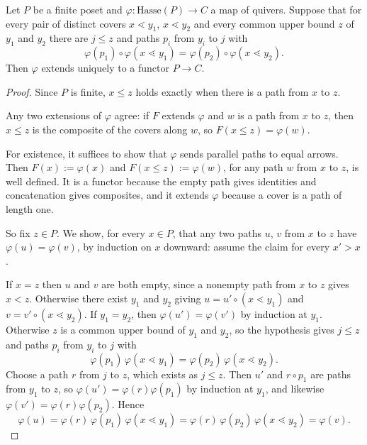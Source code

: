 \documentclass[11pt]{article}
\begin{document}
\begin{lemma}\label{thm:newman}
  Let $P$ be a finite poset and $\varphi : \mathrm{Hasse}(P) \to C$ a map of quivers. Suppose that
  for every pair of distinct covers $x \lessdot y_1$, $x \lessdot y_2$ and every common upper bound
  $z$ of $y_1$ and $y_2$ there are $j \le z$ and paths $p_i$ from $y_i$ to $j$ with
  \[
  \varphi(p_1) \circ \varphi(x \lessdot y_1) = \varphi(p_2) \circ \varphi(x \lessdot y_2) .
  \]
  Then $\varphi$ extends uniquely to a functor $P \to C$.
\end{lemma}
\begin{proof}
  Since $P$ is finite, $x \le z$ holds exactly when there is a path from $x$ to $z$.

  Any two extensions of $\varphi$ agree: if $F$ extends $\varphi$ and $w$ is a path from $x$ to
  $z$, then $x \le z$ is the composite of the covers along $w$, so $F(x \le z) = \varphi(w)$.

  For existence, it suffices to show that $\varphi$ sends parallel paths to equal arrows. Then
  $F(x) := \varphi(x)$ and $F(x \le z) := \varphi(w)$, for any path $w$ from $x$ to $z$, is well
  defined. It is a functor because the empty path gives identities and concatenation gives
  composites, and it extends $\varphi$ because a cover is a path of length one.

  So fix $z \in P$. We show, for every $x \in P$, that any two paths $u$, $v$ from $x$ to $z$ have
  $\varphi(u) = \varphi(v)$, by induction on $x$ downward: assume the claim for every $x' > x$.

  If $x = z$ then $u$ and $v$ are both empty, since a nonempty path from $x$ to $z$ gives
  $x < z$. Otherwise there exist $y_1$ and $y_2$ giving $u = u' \circ (x \lessdot y_1)$ and 
  $v = v' \circ (x \lessdot y_2)$. If $y_1 = y_2$, then
  $\varphi(u') = \varphi(v')$ by induction at $y_1$. Otherwise $z$ is a common upper bound of
  $y_1$ and $y_2$, so the hypothesis gives $j \le z$ and paths $p_i$ from $y_i$ to $j$ with
  \[ 
    \varphi(p_1)\,\varphi(x \lessdot y_1) = \varphi(p_2)\,\varphi(x \lessdot y_2) .
  \]
  Choose a path $r$ from $j$ to $z$, which exists as $j \le z$. 
  Then $u'$ and $r \circ p_1$ are paths from $y_1$ to $z$, so
  $\varphi(u') = \varphi(r)\varphi(p_1)$ by induction at $y_1$, and likewise
  $\varphi(v') = \varphi(r)\varphi(p_2)$. Hence
  \[
    \varphi(u) = \varphi(r)\,\varphi(p_1)\,\varphi(x \lessdot y_1)
               = \varphi(r)\,\varphi(p_2)\,\varphi(x \lessdot y_2) = \varphi(v) .
  \]
\end{proof}
\end{document}
